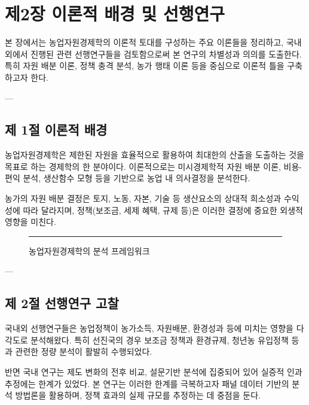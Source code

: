 \chapter{제2장 이론적 배경 및 선행연구}

본 장에서는 농업자원경제학의 이론적 토대를 구성하는 주요 이론들을 정리하고,  
국내외에서 진행된 관련 선행연구들을 검토함으로써 본 연구의 차별성과 의의를 도출한다.  
특히 자원 배분 이론, 정책 충격 분석, 농가 행태 이론 등을 중심으로 이론적 틀을 구축하고자 한다.

---

\section{제 1절 이론적 배경}

농업자원경제학은 제한된 자원을 효율적으로 활용하여 최대한의 산출을 도출하는 것을 목표로 하는 경제학의 한 분야이다.  
이론적으로는 미시경제학적 자원 배분 이론, 비용-편익 분석, 생산함수 모형 등을 기반으로 농업 내 의사결정을 분석한다.

농가의 자원 배분 결정은 토지, 노동, 자본, 기술 등 생산요소의 상대적 희소성과 수익성에 따라 달라지며,  
정책(보조금, 세제 혜택, 규제 등)은 이러한 결정에 중요한 외생적 영향을 미친다.

\begin{figure}[htbp]
  \centering
  \rule{0.8\linewidth}{5cm} %
  \caption{농업자원경제학의 분석 프레임워크}\label{fig:chapter2_1}
\end{figure}

---

\section{제 2절 선행연구 고찰}

국내외 선행연구들은 농업정책이 농가소득, 자원배분, 환경성과 등에 미치는 영향을 다각도로 분석해왔다.  
특히 선진국의 경우 보조금 정책과 환경규제, 청년농 유입정책 등과 관련한 정량 분석이 활발히 수행되었다.  

반면 국내 연구는 제도 변화의 전후 비교, 설문기반 분석에 집중되어 있어 실증적 인과 추정에는 한계가 있었다.  
본 연구는 이러한 한계를 극복하고자 패널 데이터 기반의 분석 방법론을 활용하며,  
정책 효과의 실제 규모를 추정하는 데 중점을 둔다.



